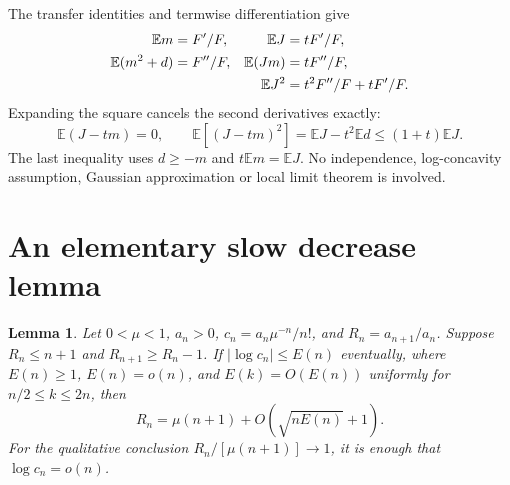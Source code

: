\documentclass[11pt,letterpaper]{article}
\newtheorem{lemma}[theorem]{Lemma}
\theoremstyle{remark}
\newcommand{\E}{\mathbb E}
\begin{document}
The transfer identities and termwise differentiation give
\begin{align}
 \E m&=F'/F,& \E J&=tF'/F,\notag\\
 \E(m^2+d)&=F''/F,& \E(Jm)&=tF''/F,\label{a58:rt:eq:tiltedmoments}\\
 &&\E J^2&=t^2F''/F+tF'/F.\notag
\end{align}
Expanding the square cancels the second derivatives exactly:
\begin{equation}\label{a58:rt:eq:tiltedidentity}
 \E(J-tm)=0,\qquad
 \E[(J-tm)^2]=\E J-t^2\E d\le(1+t)\E J.
\end{equation}
The last inequality uses $d\ge-m$ and $t\E m=\E J$.
No independence, log-concavity assumption, Gaussian approximation or
local limit theorem is involved.

\section{An elementary slow decrease lemma}\label{a58:rt:sec:slow}
\begin{lemma}\label{a58:rt:lem:slow}
Let $0<\mu<1$, $a_n>0$, $c_n=a_n\mu^{-n}/n!$, and
$R_n=a_{n+1}/a_n$. Suppose $R_n\le n+1$ and $R_{n+1}\ge R_n-1$.
If $|\log c_n|\le E(n)$ eventually, where $E(n)\ge1$, $E(n)=o(n)$,
and $E(k)=O(E(n))$ uniformly for $n/2\le k\le2n$, then
\begin{equation}\label{a58:rt:eq:slowerate}
 R_n=\mu(n+1)+O\!\left(\sqrt{nE(n)}+1\right).
\end{equation}
For the qualitative conclusion $R_n/[\mu(n+1)]\to1$, it is enough that
$\log c_n=o(n)$.
\end{lemma}
\end{document}
